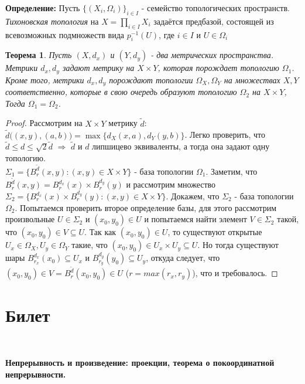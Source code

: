 \documentclass[a4paper,100pt]{article}
\theoremstyle{indented}
\newtheorem{theorem}{Теорема}
\begin{document}
    \textbf{Определение:} Пусть $\{(X_i, \Omega_i)\}_{i \in I}$ - семейство топологических пространств. \textit{Тихоновская топология} на $X=\prod_{i \in I} X_i$ задаётся предбазой, состоящей из всевозможных подмножеств вида $p_i^{-1}(U)$, где $i \in I$ и $U \in \Omega_i$\\

    \begin{theorem}
    Пусть $(X, d_x)$ и $(Y, d_y)$ - два метрических пространства. Метрики $d_x, d_y$ задают метрику на $X \times Y$, которая порождает топологию $\Omega_1$. Кроме того, метрики $d_x, d_y$ порождают топологии $\Omega_X, \Omega_Y$ на множествах $X, Y$ соответственно, которые в свою очередь образуют топологию $\Omega_2$ на $X \times Y$, Тогда $\Omega_1 = \Omega_2$.
    \end{theorem}
    \begin{proof}
    Рассмотрим на $X \times Y$ метрику $\widetilde{d}$:
    $\widetilde{d}\big((x, y), (a, b)\big)=\max\{d_X(x, a), d_Y(y, b)\}$. Легко проверить, что $\widetilde{d} \leq d \leq \sqrt{2} \widetilde{d}$ $\Rightarrow$ $\widetilde{d}$ и $d$ липшицево эквиваленты, а тогда она задают одну топологию. 
    \\
    
    $\Sigma_1 = \{B_r^{\widetilde{d}}(x, y) : (x, y) \in X \times Y\}$ - база топологии $\Omega_1$. Заметим, что $B_r^{\widetilde{d}}(x, y) = B_r^{d_x}(x) \times B_r^{d_y}(y)$ и рассмотрим множество $\Sigma_2=\{B_r^{d_x}(x) \times B_r^{d_y}(y) : (x, y) \in X \times Y\}$. Докажем, что $\Sigma_2$ - база топологии $\Omega_2$. Попытаемся проверить второе определение базы, для этого рассмотрим произвольные $U \in \Sigma_2$ и $(x_0, y_0) \in U$ и попытаемся найти элемент $V \in \Sigma_2$ такой, что $(x_0, y_0) \in V \subseteq U$. Так как $(x_0, y_0) \in U$, то существуют открытые $U_x \in \Omega_X, U_y \in \Omega_Y$ такие, что $(x_0, y_0) \in U_x \times U_y \subseteq U$. Но тогда существуют шары $B_{r_x}^{d_x}(x_0) \subseteq U_x$ и $B_{r_y}^{d_y}(y_0) \subseteq U_y$, откуда следует, что $(x_0, y_0) \in V=B_r^{\widetilde{d}}(x_0, y_0) \in U$ ($r=max(r_x, r_y)$), что и требовалось.
    \end{proof}

\section{Билет} \

\medskip

\textbf{Непрерывность и произведение: проекции, теорема о покоординатной непрерывности.}\\
\end{document}
